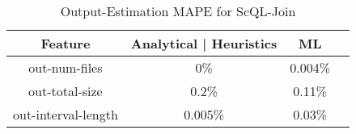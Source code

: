 \begin{table}[t]
\centering
\caption{Output-Estimation MAPE for ScQL-Join}\label{tab:output-estimation}
 \begin{tabular}{|c|c|c|c|}
        \hline
        \textbf{Feature} & \textbf{Analytical} | \textbf{Heuristics} & \textbf{ML} \\
        \hline
        out-num-files & 0\%  & 0.004\% \\
        out-total-size & 0.2\% & 0.11\% \\
        out-interval-length & 0.005\% & 0.03\% \\\hline
\end{tabular}
\end{table}







%